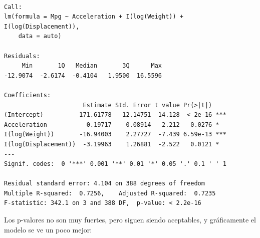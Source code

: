 \documentclass[
]{article}
\newenvironment{Shaded}{\begin{snugshade}}{\end{snugshade}}
\newcommand{\CommentTok}[1]{\textcolor[rgb]{0.56,0.35,0.01}{\textit{#1}}}
\newcommand{\DataTypeTok}[1]{\textcolor[rgb]{0.13,0.29,0.53}{#1}}
\newcommand{\KeywordTok}[1]{\textcolor[rgb]{0.13,0.29,0.53}{\textbf{#1}}}
\newcommand{\NormalTok}[1]{#1}
\newcommand{\OperatorTok}[1]{\textcolor[rgb]{0.81,0.36,0.00}{\textbf{#1}}}
\newcommand{\StringTok}[1]{\textcolor[rgb]{0.31,0.60,0.02}{#1}}
\begin{document}
\begin{verbatim}

Call:
lm(formula = Mpg ~ Acceleration + I(log(Weight)) + I(log(Displacement)), 
    data = auto)

Residuals:
     Min       1Q   Median       3Q      Max 
-12.9074  -2.6174  -0.4104   1.9500  16.5596 

Coefficients:
                      Estimate Std. Error t value Pr(>|t|)    
(Intercept)          171.61778   12.14751  14.128  < 2e-16 ***
Acceleration           0.19717    0.08914   2.212   0.0276 *  
I(log(Weight))       -16.94003    2.27727  -7.439 6.59e-13 ***
I(log(Displacement))  -3.19963    1.26881  -2.522   0.0121 *  
---
Signif. codes:  0 '***' 0.001 '**' 0.01 '*' 0.05 '.' 0.1 ' ' 1

Residual standard error: 4.104 on 388 degrees of freedom
Multiple R-squared:  0.7256,    Adjusted R-squared:  0.7235 
F-statistic: 342.1 on 3 and 388 DF,  p-value: < 2.2e-16
\end{verbatim}

Los p-valores no son muy fuertes, pero siguen siendo aceptables, y
gráficamente el modelo se ve un poco mejor:

\begin{Shaded}
\end{Shaded}
\end{document}
